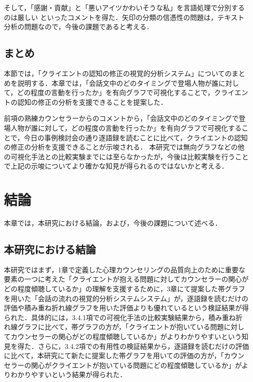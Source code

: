 \documentclass[shuuron]{kuee}
\begin{document}
そして，「感謝・貢献」と「悪いアイツかわいそうな私」を言語処理で分別するのは厳しい
といったコメントを得た．矢印の分類の信憑性の問題は，テキスト分析の問題なので，今後の課題であると考える．


\section{まとめ}%
本節では，「クライエントの認知の修正の視覚的分析システム」についてのまとめを説明する．本章では，「会話文中のどのタイミングで登場人物が誰に対して，どの程度の言動を行ったか」を有向グラフで可視化することで，クライエントの認知の修正の分析を支援できることを提案した．

前項の熟練カウンセラーからのコメントから，「会話文中のどのタイミングで登場人物が誰に対して，どの程度の言動を行ったか」を有向グラフで可視化することで，今日の事例検討会の通り逐語録を読むことに比べて，クライエントの認知の修正の分析を支援できることが示唆される．
本研究では無向グラフなどの他の可視化手法との比較実験までには至らなかったが，今後は比較実験を行うことで上記の示唆についてより確かな知見が得られるのではないかと考える．


\chapter{結論}%

本章では，本研究における結論，および，今後の課題について述べる．

\section{本研究における結論}



本研究ではまず，1章で定義した心理カウンセリングの品質向上のために重要な要素の一つに考えた「クライエントが抱える問題に対してカウンセラーの関心がどの程度傾聴しているか」の理解を支援するために，3章にて提案した帯グラフを用いた「会話の流れの視覚的分析システムシステム」が，逐語録を読むだけの評価や積み重ね折れ線グラフを用いた評価よりも優れているという検証結果が得られた．具体的には，3.4.1項での可視化手法の比較実験結果から，積み重ね折れ線グラフに比べて，帯グラフの方が，「クライエントが抱いている問題に対してカウンセラーの関心がどの程度傾聴しているか」がよりわかりやすいという知見を得た．さらに，3.4.2項での有用性の検証結果から，逐語録を読むだけの評価に比べて，本研究にて新たに提案した帯グラフを用いての評価の方が，「カウンセラーの関心がクライエントが抱いている問題にどの程度傾聴しているか」がよりわかりやすいという結果が得られた．
%
\end{document}
